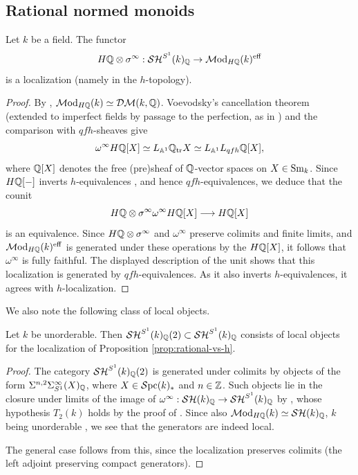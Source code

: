 \documentclass{amsart}
\numberwithin{proposition}{section}
\numberwithin{equation}{section}
\begin{document}
\subsection{Rational normed monoids}
\begin{proposition} \label{prop:rational-vs-h}
Let $k$ be a field.
The functor \[ H\mathbb{Q} \otimes \sigma^\infty: \mathcal{SH}^{S^1}(k)_{\mathbb{Q}} \to \mathcal{M}\mathrm{od}_{H\mathbb{Q}}(k)^{\mathrm{eff}} \] is a localization (namely in the $h$-topology).
\end{proposition}
\begin{proof}
By \cite[Theorems~14.2.9 and~16.1.4, Corollary~16.1.7(1)]{triangulated-mixed-motives}, $\mathcal{M}\mathrm{od}_{H\mathbb{Q}}(k) \simeq \mathcal{DM}(k,\mathbb{Q})$.
Voevodsky's cancellation theorem \cite[Corollary~4.10]{voevodsky2002cancellation} (extended to imperfect fields by passage to the perfection, as in \cite[proof of Corollary~5.5.5(2)]{cisinski-deglise-etale-motives}) and the comparison with $qfh$-sheaves \cite[Theorem~10.5.6 and Proposition~10.5.12]{triangulated-mixed-motives} give
\[
  \omega^\infty H\mathbb{Q}[X]
  \simeq L_{\mathbb A^1}\mathbb{Q}_{\mathrm{tr}}X
  \simeq L_{\mathbb A^1}L_{qfh}\mathbb{Q}[X],
\]
where $\mathbb{Q}[X]$ denotes the free (pre)sheaf of $\mathbb{Q}$-vector spaces on $X \in {\mathrm{S}\mathrm{m}}_k$.
Since $H\mathbb{Q}[\mathord-]$ inverts $h$-equivalences \cite[Theorem~14.3.4(2)]{triangulated-mixed-motives}, and hence $qfh$-equivalences, we deduce that the counit
\[
  H\mathbb{Q} \otimes \sigma^\infty \omega^\infty H\mathbb{Q}[X]
  \longrightarrow H\mathbb{Q}[X]
\]
is an equivalence.
Since $H\mathbb{Q} \otimes \sigma^\infty$ and $\omega^\infty$ preserve colimits and finite limits, and $\mathcal{M}\mathrm{od}_{H\mathbb{Q}}(k)^{\mathrm{eff}}$ is generated under these operations by the $H\mathbb{Q}[X]$, it follows that $\omega^\infty$ is fully faithful.
The displayed description of the unit shows that this localization is generated by $qfh$-equivalences.
As it also inverts $h$-equivalences, it agrees with $h$-localization.
\end{proof}

We also note the following class of local objects.
\begin{lemma} \label{lemm:NMon-Q-local-objects}
Let $k$ be unorderable.
Then $\mathcal{SH}^{S^1}(k)_{\mathbb{Q}}(2) \subset \mathcal{SH}^{S^1}(k)_{\mathbb{Q}}$ consists of local objects for the localization of Proposition \ref{prop:rational-vs-h}.
\end{lemma}
\begin{proof}
The category $\mathcal{SH}^{S^1}(k)_{\mathbb{Q}}(2)$ is generated under colimits by objects of the form $\Sigma^{n,2}\Sigma^\infty_{S^1}(X)_{\mathbb{Q}}$, where $X \in \mathcal{S}\mathrm{pc}{}(k)_*$ and $n \in \mathbb{Z}$.
Such objects lie in the closure under limits of the image of $\omega^\infty: \mathcal{SH}(k)_{\mathbb{Q}} \to \mathcal{SH}^{S^1}(k)_{\mathbb{Q}}$ by \cite[Theorem~4.14(1)]{bachmann-moving2}, whose hypothesis $T_2(k)$ holds by the proof of \cite[Theorem~2.2.30]{freudenthal}.
Since also $\mathcal{M}\mathrm{od}_{H\mathbb{Q}}(k) \simeq \mathcal{SH}(k)_{\mathbb{Q}}$, $k$ being unorderable \cite[Corollary~16.2.14]{triangulated-mixed-motives}, we see that the generators are indeed local.

The general case follows from this, since the localization preserves colimits (the left adjoint preserving compact generators).
\end{proof}
\end{document}

